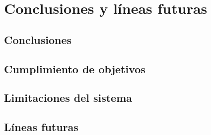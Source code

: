 \documentclass[../main.tex]{subfiles}
\begin{document}
\section{Conclusiones y líneas futuras}

\subsection{Conclusiones}


\subsection{Cumplimiento de objetivos}


\subsection{Limitaciones del sistema}


\subsection{Líneas futuras}

\end{document}
